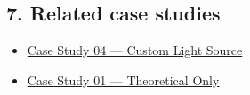 \documentclass[
  11pt,
]{article}
\providecommand{\tightlist}{
  \setlength{\itemsep}{0pt}\setlength{\parskip}{0pt}}
\begin{document}
\hypertarget{7-related-case-studies}{
\subsection{7. Related case studies}\label{7-related-case-studies}}

\begin{itemize}
\tightlist
\item
  \href{https://github.com/pinarsyt/overlap-calculator/blob/main/case_studies/04_custom_light_source/README.md}{Case
  Study 04 --- Custom Light Source}
\item
  \href{https://github.com/pinarsyt/overlap-calculator/blob/main/case_studies/01_theoretical_only/README.md}{Case
  Study 01 --- Theoretical Only}
\end{itemize}
\end{document}
